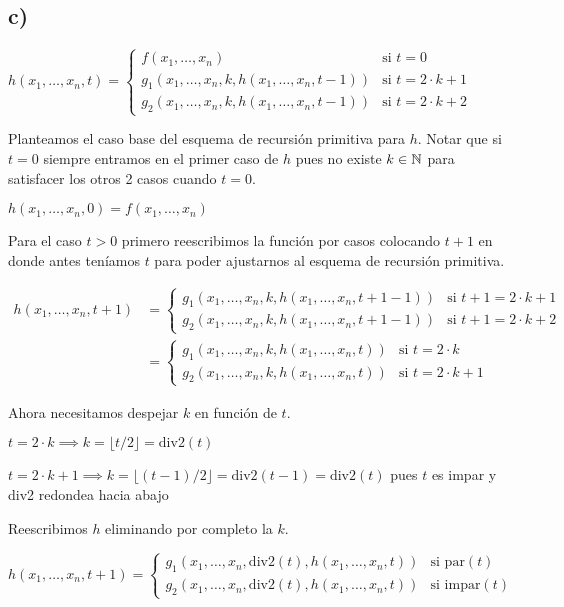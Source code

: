 \subsection*{c)}

$h(x_1, \dots, x_n, t) = \begin{cases}
    f(x_1, \dots, x_n) & \text{si } t = 0 \\
    g_1(x_1, \dots, x_n, k, h(x_1, \dots, x_n, t - 1)) & \text{si } t = 2 \cdot k + 1 \\
    g_2(x_1, \dots, x_n, k, h(x_1, \dots, x_n, t - 1)) & \text{si } t = 2 \cdot k + 2
\end{cases}$

Planteamos el caso base del esquema de recursión primitiva para $h$. Notar que si $t = 0$ siempre entramos en el primer caso de $h$ pues no existe $k \in \mathbb{N}$ para satisfacer los otros 2 casos cuando $t = 0$.

$h(x_1, \dots, x_n, 0) = f(x_1, \dots, x_n)$

Para el caso $t > 0$ primero reescribimos la función por casos colocando $t + 1$ en donde antes teníamos $t$ para poder ajustarnos al esquema de recursión primitiva.

$
\begin{aligned}
h(x_1, \dots, x_n, t + 1)
& = \begin{cases}
    g_1(x_1, \dots, x_n, k, h(x_1, \dots, x_n, t + 1 - 1)) & \text{si } t + 1 = 2 \cdot k + 1 \\
    g_2(x_1, \dots, x_n, k, h(x_1, \dots, x_n, t + 1 - 1)) & \text{si } t + 1 = 2 \cdot k + 2
\end{cases} \\
& = \begin{cases}
    g_1(x_1, \dots, x_n, k, h(x_1, \dots, x_n, t)) & \text{si } t = 2 \cdot k \\
    g_2(x_1, \dots, x_n, k, h(x_1, \dots, x_n, t)) & \text{si } t = 2 \cdot k + 1
\end{cases}
\end{aligned}
$

Ahora necesitamos despejar $k$ en función de $t$.

$t = 2 \cdot k \implies k = \lfloor t / 2 \rfloor = \text{div2}(t)$

$t = 2 \cdot k + 1 \implies k = \lfloor (t - 1) / 2 \rfloor = \text{div2}(t - 1) = \text{div2}(t)$ pues $t$ es impar y div2 redondea hacia abajo

Reescribimos $h$ eliminando por completo la $k$.

$h(x_1, \dots, x_n, t + 1) = \begin{cases}
    g_1(x_1, \dots, x_n, \text{div2}(t), h(x_1, \dots, x_n, t)) & \text{si } \text{par}(t) \\
    g_2(x_1, \dots, x_n, \text{div2}(t), h(x_1, \dots, x_n, t)) & \text{si } \text{impar}(t)
\end{cases}$

